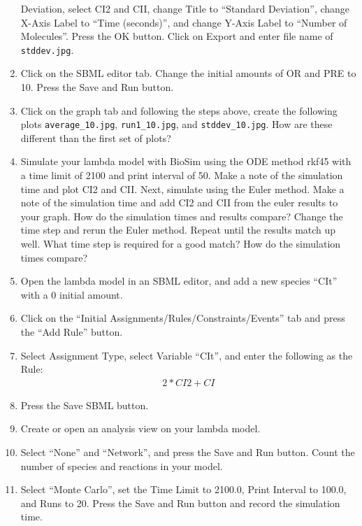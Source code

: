 \documentclass[titlepage,11pt]{article}
\begin{document}
\begin{enumerate}
      Deviation, select CI2 and CII, change Title to ``Standard Deviation'', 
      change X-Axis Label to ``Time (seconds)'', and change
      Y-Axis Label to ``Number of Molecules''.  Press the OK button.
      Click on Export and enter file name of {\tt stddev.jpg}.
\item Click on the SBML editor tab.  Change the initial amounts of OR and
      PRE to 10.  Press the Save and Run button.
\item Click on the graph tab and following the steps above, create the 
      following plots {\tt average\_10.jpg},  {\tt run1\_10.jpg}, and
      {\tt stddev\_10.jpg}.  How are these different than the first set
      of plots?  
\item Simulate your lambda model with BioSim using the ODE method rkf45 with
      a time limit of 2100 and print interval of 50.
      Make a note of the simulation time and plot CI2 and CII.  
      Next, simulate using the Euler method.  Make a note of the simulation time
      and add CI2 and CII from the euler results to your graph.  
      How do the simulation times and results compare?
      Change the time step and rerun the Euler method.  Repeat until the results
      match up well.  What time step is required for a good match?
      How do the simulation times compare?
\item Open the lambda model in an SBML editor, and add a new species
      ``CIt'' with a 0 initial amount.

\item Click on the ``Initial Assignments/Rules/Constraints/Events'' tab
      and press the ``Add Rule'' button.

\item Select Assignment Type, select Variable ``CIt'', and enter the following
      as the Rule:
\begin{eqnarray*}
& 2 * CI2 + CI &
\end{eqnarray*}

\item Press the Save SBML button.

\item Create or open an analysis view on your lambda model.

\item Select ``None'' and ``Network'', and press the Save and Run button. 
      Count the number of species and reactions in your model.  

\item Select ``Monte Carlo'', set the Time Limit to 2100.0, Print Interval to
      100.0, and Runs to 20.  Press the Save and Run button and record the
      simulation time.


\end{enumerate}
\end{document}
